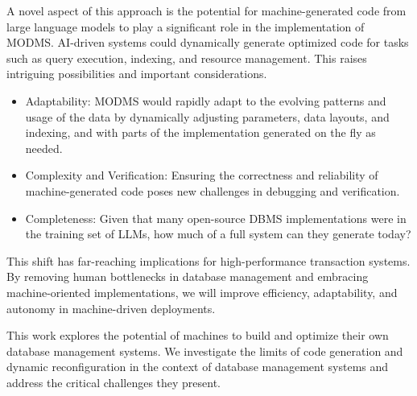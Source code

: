 \documentclass[acmsmall, nonacm]{acmart}
\begin{document}
A novel aspect of this approach is the potential for machine-generated code from large language models to play a significant role in the implementation of MODMS. AI-driven systems could dynamically generate optimized code for tasks such as query execution, indexing, and resource management. This raises intriguing possibilities and important considerations.

\begin{itemize}
    \item Adaptability: MODMS would rapidly adapt to the evolving patterns and usage of the data by dynamically adjusting parameters, data layouts, and indexing, and with parts of the implementation generated on the fly as needed.
    \item Complexity and Verification: Ensuring the correctness and reliability of machine-generated code poses new challenges in debugging and verification.
    \item Completeness: Given that many open-source DBMS implementations were in the training set of LLMs, how much of a full system can they generate today?
\end{itemize}

This shift has far-reaching implications for high-performance transaction systems. By removing human bottlenecks in database management and embracing machine-oriented implementations, we will improve efficiency, adaptability, and autonomy in machine-driven deployments.

This work explores the potential of machines to build and optimize their own database management systems. We investigate the limits of code generation and dynamic reconfiguration in the context of database management systems and address the critical challenges they present.
\end{document}
